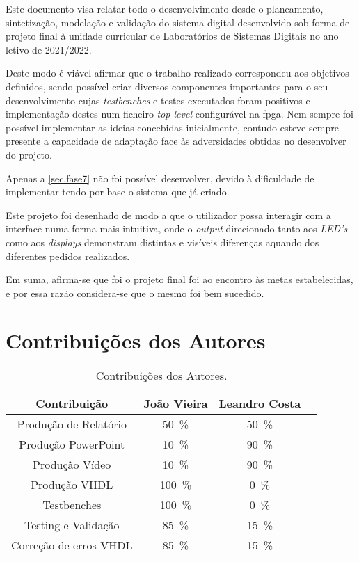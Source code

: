 Este documento visa relatar todo o desenvolvimento desde o planeamento, sintetização, modelação e validação do sistema digital desenvolvido sob forma de projeto final à unidade curricular de Laboratórios de Sistemas Digitais no ano letivo de 2021/2022.\par
Deste modo é viável afirmar que o trabalho realizado correspondeu aos objetivos definidos, sendo possível criar diversos componentes importantes para o seu desenvolvimento cujas \textit{testbenches} e testes executados foram positivos e implementação destes num ficheiro \textit{top-level} configurável na \ac{fpga}. Nem sempre foi possível implementar as ideias concebidas inicialmente, contudo esteve sempre presente a capacidade de adaptação face às adversidades obtidas no desenvolver do projeto.\par 
Apenas a \autoref{sec.fase7} não foi possível desenvolver, devido à dificuldade de implementar tendo por base o sistema que já criado.\par
Este projeto foi desenhado de modo a que o utilizador possa interagir com a interface numa forma mais intuitiva, onde o \emph{output} direcionado tanto aos \emph{LED's} como aos \emph{displays} demonstram distintas e visíveis diferenças aquando dos diferentes pedidos realizados.\par
Em suma, afirma-se que foi o projeto final foi ao encontro às metas estabelecidas, e por essa razão considera-se que o mesmo foi bem sucedido.

%
% 
\chapter*{Contribuições dos Autores}

\begin{table}[H]
    \centering
    \caption{Contribuições dos Autores.}
    \begin{tabular}{|c|c|c|c|}\hline

        Contribuição 			& João Vieira 	& Leandro Costa  	\\ 
        \hline
	    Produção de Relatório 	& 50~\% 		& 50~\%	    	 	\\
	    Produção PowerPoint 	& 10~\% 		& 90~\%  			\\
	    Produção Vídeo 			& 10~\% 		& 90~\% 			\\ 
		Produção VHDL 			& 100~\% 		& 0~\%				\\
		Testbenches 			& 100~\% 		& 0~\%				\\
		Testing e Validação 	& 85~\% 		& 15~\% 			\\
		Correção de erros VHDL	& 85~\% 		& 15~\% 			\\		
		
    \hline
    \end{tabular}
    \label{tab.contribuições}
\end{table}	

